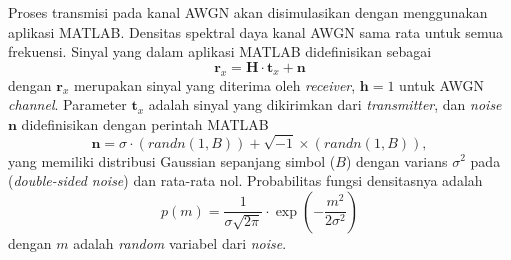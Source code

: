 Proses transmisi pada kanal AWGN akan disimulasikan dengan menggunakan aplikasi MATLAB. Densitas spektral daya kanal AWGN sama rata untuk semua frekuensi. 
Sinyal yang  dalam aplikasi MATLAB didefinisikan sebagai 
\begin{equation}
\mathbf{r}_{x}=\mathbf{H}\cdot \mathbf{t}_{x}+\mathbf{n}
\label{eq:AWGN matlab}
\end{equation}
dengan $\mathbf{r}_{x}$ merupakan sinyal yang diterima oleh \textit{receiver}, $\mathbf{h}=1$ untuk AWGN \textit{channel}. Parameter $\mathbf{t}_{x}$ adalah sinyal yang dikirimkan dari \textit{transmitter}, dan \textit{noise} $\mathbf{n}$ didefinisikan dengan perintah MATLAB
\begin{equation}
\mathbf{n}=\sigma \cdot (randn(1,B)) + \sqrt{-1} \times (randn(1,B)),
\end{equation}
yang memiliki distribusi Gaussian sepanjang simbol ($B$) dengan varians $\sigma^2$ pada (\textit{double-sided noise}) dan rata-rata nol. Probabilitas fungsi densitasnya adalah
\begin{equation}
p(m)=\frac{1}{\sigma \sqrt{2\pi}}\cdot \exp \left ( -\frac{m^2}{2\sigma ^{2}} \right )
\label{eq:prob dens}
\end{equation}
dengan $m$ adalah \textit{random} variabel dari \textit{noise}.

